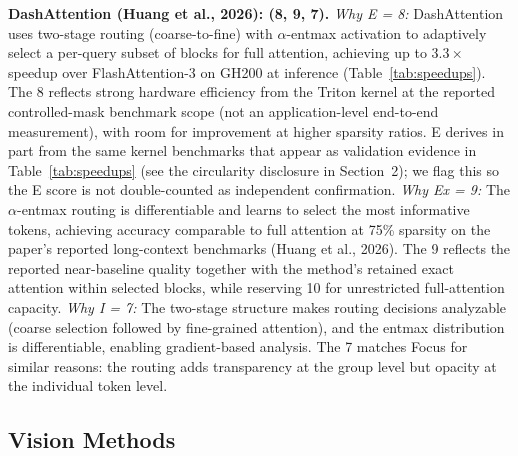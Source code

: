 \documentclass[10pt,twocolumn]{article}
\begin{document}
\textbf{DashAttention (Huang et al., 2026): (8, 9, 7).}
\textit{Why E = 8:} DashAttention uses two-stage routing (coarse-to-fine) with $\alpha$-entmax activation to adaptively select a per-query subset of blocks for full attention, achieving up to $3.3\times$ speedup over FlashAttention-3 on GH200 at inference (Table~\ref{tab:speedups}). The 8 reflects strong hardware efficiency from the Triton kernel at the reported controlled-mask benchmark scope (not an application-level end-to-end measurement), with room for improvement at higher sparsity ratios. E derives in part from the same kernel benchmarks that appear as validation evidence in Table~\ref{tab:speedups} (see the circularity disclosure in Section~2); we flag this so the E score is not double-counted as independent confirmation. \textit{Why Ex = 9:} The $\alpha$-entmax routing is differentiable and learns to select the most informative tokens, achieving accuracy comparable to full attention at 75\% sparsity on the paper's reported long-context benchmarks (Huang et al., 2026). The 9 reflects the reported near-baseline quality together with the method's retained exact attention within selected blocks, while reserving 10 for unrestricted full-attention capacity. \textit{Why I = 7:} The two-stage structure makes routing decisions analyzable (coarse selection followed by fine-grained attention), and the entmax distribution is differentiable, enabling gradient-based analysis. The 7 matches Focus for similar reasons: the routing adds transparency at the group level but opacity at the individual token level.

\subsection*{Vision Methods}
\end{document}
